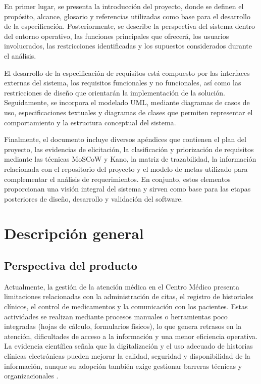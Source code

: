 \documentclass[11pt,a4paper]{article}
\begin{document}
	En primer lugar, se presenta la introducción del proyecto, donde se definen el propósito, alcance, glosario y referencias utilizadas como base para el desarrollo de la especificación. Posteriormente, se describe la perspectiva del sistema dentro del entorno operativo, las funciones principales que ofrecerá, los usuarios involucrados, las restricciones identificadas y los supuestos considerados durante el análisis.
	
	El desarrollo de la especificación de requisitos está compuesto por las interfaces externas del sistema, los requisitos funcionales y no funcionales, así como las restricciones de diseño que orientarán la implementación de la solución. Seguidamente, se incorpora el modelado UML, mediante diagramas de casos de uso, especificaciones textuales y diagramas de clases que permiten representar el comportamiento y la estructura conceptual del sistema.
	
	Finalmente, el documento incluye diversos apéndices que contienen el plan del proyecto, las evidencias de elicitación, la clasificación y priorización de requisitos mediante las técnicas MoSCoW y Kano, la matriz de trazabilidad, la información relacionada con el repositorio del proyecto y el modelo de metas utilizado para complementar el análisis de requerimientos. En conjunto, estos elementos proporcionan una visión integral del sistema y sirven como base para las etapas posteriores de diseño, desarrollo y validación del software.
	
	
	
	\section{ Descripción general}
	
	\subsection{ Perspectiva del producto}
	
	Actualmente, la gestión de la atención médica en el Centro Médico presenta limitaciones relacionadas con la administración de citas, el registro de historiales clínicos, el control de medicamentos y la comunicación con los pacientes. Estas actividades se realizan mediante procesos manuales o herramientas poco integradas (hojas de cálculo, formularios físicos), lo que genera retrasos en la atención, dificultades de acceso a la información y una menor eficiencia operativa. La evidencia científica señala que la digitalización y el uso adecuado de historias clínicas electrónicas pueden mejorar la calidad, seguridad y disponibilidad de la información, aunque su adopción también exige gestionar barreras técnicas y organizacionales \cite{buntin2011,campanella2016,kruse2016}.
	
\end{document}
